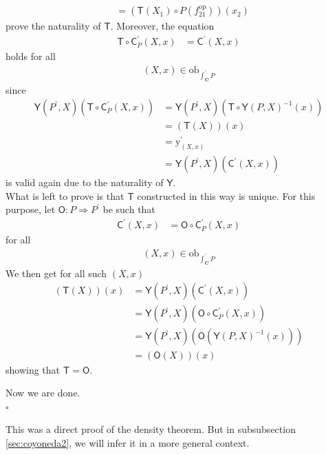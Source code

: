 \begin{prf}
\begin{description}
\begin{align*}
  \\
  &=
  \left(
    \mathsf{T}(X_{1})
    \circ
    P(f_{21}^{\mathrm{op}})
  \right)
  (x_{2})
\end{align*}
prove the naturality of $\mathsf{T}$.
Moreover, the equation
\begin{align*}
  \mathsf{T}
  \circ
  \mathsf{C}_{P}^{\prime}(X,x)
  &=
  \mathsf{C}^{\prime}(X,x)
\end{align*}
holds for all
\begin{align*}
  (X,x)
  \in
  \mathrm{ob}_{\int_{\mathbf{C}}^{\prime}P}
\end{align*}
since
\begin{align*}
  \mathsf{Y}(P^{\backprime},X)
  \left(
    \mathsf{T}
    \circ
    \mathsf{C}_{P}^{\prime}(X,x)
  \right)
  &=
  \mathsf{Y}(P^{\backprime},X)
  \left(
    \mathsf{T}
    \circ
    \mathsf{Y}(P,X)^{-1}(x)
  \right)
  \tag{NT}
  \\
  &=
  (\mathsf{T}(X))(x)
  \\
  &=
  \mathrm{y}_{(X,x)}^{\backprime}
  \\
  &=
  \mathsf{Y}(P^{\backprime},X)
  \left(
    \mathsf{C}^{\prime}(X,x)
  \right)
\end{align*}
is valid again due to the naturality of $\mathsf{Y}$.
\\
What is left to prove is that $\mathsf{T}$ constructed in this way is unique.
For this purpose, let $\mathsf{O} \colon P \Rightarrow P^{\backprime}$ be such that
\begin{align*}
  \mathsf{C}^{\prime}(X,x)
  &=
  \mathsf{O}
  \circ
  \mathsf{C}_{P}^{\prime}(X,x)
\end{align*}
for all
\begin{align*}
  (X,x)
  \in
  \mathrm{ob}_{\int_{\mathbf{C}}^{\prime}P}
\end{align*}
We then get for all such $(X,x)$
\begin{align*}
  (\mathsf{T}(X))(x)
  &=
  \mathsf{Y}(P^{\backprime},X)
  \left(
    \mathsf{C}^{\prime}(X,x)
  \right)
  \\
  &=
  \mathsf{Y}(P^{\backprime},X)
  \left(
    \mathsf{O}
    \circ
    \mathsf{C}_{P}^{\prime}(X,x)
  \right)
  \\
  &=
  \mathsf{Y}(P^{\backprime},X)
  \left(
    \mathsf{O}
    \left(
      \mathsf{Y}(P,X)^{-1}(x)
    \right)
  \right)
  \tag{NT}
  \\
  &=
  (\mathsf{O}(X))(x)
\end{align*}
showing that $\mathsf{T} = \mathsf{O}$.
\end{description}
Now we are done.
\\
\phantom{proven}
\hfill
$\square$
\end{prf}
This was a direct proof of the density theorem.
But in subsubsection \ref{sec:coyoneda2}, we will infer it in a more general context.
